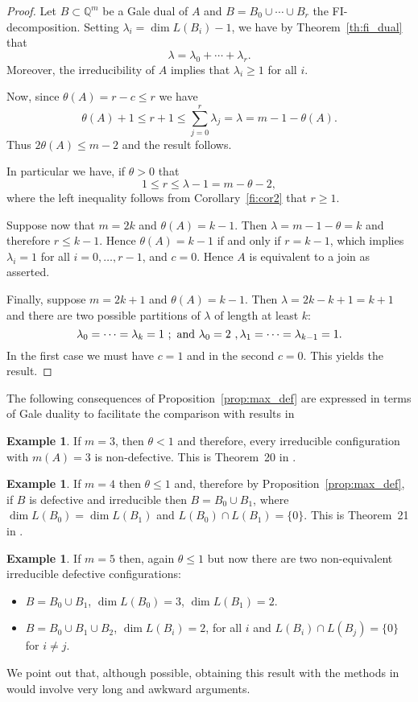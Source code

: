 \documentclass[11pt]{amsart}
\theoremstyle{plain}
\theoremstyle{definition}
\newtheorem{example}[theorem]{Example}
\theoremstyle{remark}
\newcommand{\baseRing}[1]{\ensuremath{\mathbb{#1}}}
\newcommand{\Q}{\baseRing{Q}}
\newcommand{\bp}{\begin{proof}}
\newcommand{\ep}{\end{proof}}
\newcommand{\beq}{\begin{equation}}
\newcommand{\eeq}{\end{equation}}
\numberwithin{equation}{section}
\begin{document}
\bp
Let  $B \subset \Q^m$ be a Gale dual of $A$ and 
$B = B_0 \cup \cdots \cup B_r$
the FI-decomposition.  Setting $\lambda_i = \dim L(B_i) -1$, we have by Theorem~\ref{th:fi_dual} that 
\beq\label{eq:partition}
\lambda = \lambda_0 + \cdots + \lambda_r.
\eeq
Moreover, the irreducibility of $A$ implies that $\lambda_i \geq 1$ for all $i$.

Now, since $\theta(A) = r - c \leq r$ we have
$$\theta(A) + 1 \leq r + 1 \leq \sum_{j=0}^r \lambda_j = \lambda = m - 1 - \theta(A).$$
Thus $2 \theta(A) \leq m - 2$ and the result follows.

In particular we have, if $\theta>0$ that
\beq\label{eq:bound_r}1\leq r \leq \lambda - 1 = m - \theta - 2,
\eeq
where the left inequality 
follows from  Corollary~\ref{fi:cor2} that $r\geq 1$.

Suppose now that $m = 2k$ and $\theta(A) = k-1$.  Then $\lambda = m - 1 - \theta = k$ and therefore $r \leq k-1$.  Hence  $\theta(A) = k-1$ 
if and only if $r=k-1$, which implies $\lambda_i =1$ for all $i=0,\dots,r-1$, and $c=0$.  Hence $A$ is equivalent to a join as asserted.

Finally, suppose $m = 2k+1 $ and $\theta(A) = k-1$.  Then 
$\lambda = 2k - k + 1 = k+1$ and there are two possible partitions of $\lambda$ of length at least $k$:
$$\lambda_0=\cdots=\lambda_k =1\ ;\hbox{\ and\ }
\lambda_0=2\ , \lambda_1=\cdots=\lambda_{k-1} =1.$$
In the first case we must have $c=1$ and in the second $c=0$.  This yields the result.
\ep

The following consequences of Proposition~\ref{prop:max_def} are expressed in terms of Gale duality to facilitate the comparison with results in \cite{CC}

\begin{example}\label{m=3}
If $m=3$, then $\theta < 1$ and therefore, every irreducible configuration with $m(A) = 3$ is non-defective. This is Theorem~20 in \cite{CC}.  
\end{example}

\begin{example}\label{m=4}
If $m=4$ then $\theta \leq 1$ and, therefore by Proposition~\ref{prop:max_def}, if $B$ is defective and irreducible then  $B = B_0 \cup B_1$, 
where $\dim L(B_0) = \dim L(B_1)$ and $L(B_0) \cap L(B_1) = \{0\}$.  This is Theorem~21 in \cite{CC}.
\end{example}

\begin{example}\label{m=5}
If $m=5$ then, again $\theta \leq 1$ but now there are two non-equivalent irreducible defective configurations:
\begin{itemize}
\item $B = B_0 \cup B_1$, $\dim L(B_0) = 3$, $\dim L(B_1) = 2$.
\item $B = B_0 \cup B_1 \cup B_2$,  $\dim L(B_i) = 2$, for all $i$ and $L(B_i) \cap L(B_j) = \{0\}$ for $i\not =j$.
\end{itemize}
We point out that, although possible, obtaining this result with the methods in \cite{CC} would involve very long and awkward arguments.
\end{example}
\end{document}

